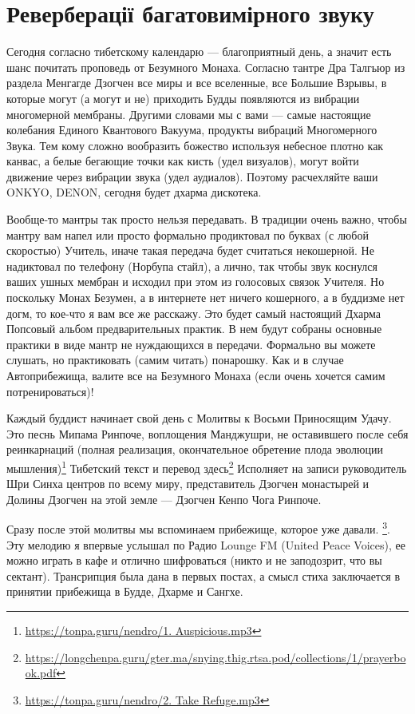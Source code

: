 \section{Реверберації багатовимірного звуку}

Сегодня согласно тибетскому календарю — благоприятный день,
а значит есть шанс почитать проповедь от Безумного Монаха.
Согласно тантре Дра Талгьюр из раздела Менгагде Дзогчен все
миры и все вселенные, все Большие Взрывы, в которые могут
(а могут и не) приходить Будды появляются из вибрации
многомерной мембраны. Другими словами мы с вами — самые
настоящие колебания Единого Квантового Вакуума, продукты
вибраций Многомерного Звука. Тем кому сложно вообразить
божество используя небесное плотно как канвас, а белые
бегающие точки как кисть (удел визуалов), могут войти
движение через вибрации звука (удел аудиалов). Поэтому
расчехляйте ваши ONKYO, DENON, сегодня будет дхарма дискотека.

Вообще-то мантры так просто нельзя передавать. В традиции
очень важно, чтобы мантру вам напел или просто формально
продиктовал по буквах (с любой скоростью) Учитель, иначе
такая передача будет считаться некошерной. Не надиктовал
по телефону (Норбупа стайл), а лично, так чтобы звук
коснулся ваших ушных мембран и исходил при этом из голосовых
связок Учителя. Но поскольку Монах Безумен, а в интернете
нет ничего кошерного, а в буддизме нет догм, то кое-что я
вам все же расскажу. Это будет самый настоящий Дхарма Попсовый
альбом предварительных практик. В нем будут собраны основные
практики в виде мантр не нуждающихся в передачи. Формально
вы можете слушать, но практиковать (самим читать) понарошку.
Как и в случае Автоприбежища, валите все на Безумного Монаха (если очень хочется самим потренироваться)!

Каждый буддист начинает свой день с Молитвы к Восьми Приносящим Удачу.
Это песнь Мипама Ринпоче, воплощения Манджушри, не оставившего после
себя реинкарнаций (полная реализация, окончательное обретение плода
эволюции мышления)\footnote{\url{https://tonpa.guru/nendro/1. Auspicious.mp3}}
Тибетский текст и перевод здесь\footnote{\url{https://longchenpa.guru/gter.ma/snying.thig.rtsa.pod/collections/1/prayerbook.pdf}}
Исполняет на записи руководитель Шри Синха центров по всему миру, представитель
Дзогчен монастырей и Долины Дзогчен на этой земле — Дзогчен Кенпо Чога Ринпоче. 

Сразу после этой молитвы мы вспоминаем прибежище, которое уже давали.
\footnote{\url{https://tonpa.guru/nendro/2. Take Refuge.mp3}}. Эту мелодию я впервые
услышал по Радио Lounge FM (United Peace Voices), ее можно играть
в кафе и отлично шифроваться (никто и не заподозрит, что вы сектант).
Трансрипция была дана в первых постах, а смысл стиха заключается в
принятии прибежища в Будде, Дхарме и Сангхе.

